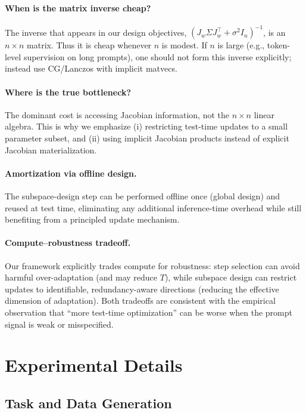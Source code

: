 \documentclass{article}
\theoremstyle{plain}
\theoremstyle{definition}
\theoremstyle{remark}
\begin{document}
\paragraph{When is the matrix inverse cheap?}
The inverse that appears in our design objectives, $(J_w\Sigma J_w^\top+\sigma^2 I_n)^{-1}$, is an $n\times n$ matrix.
Thus it is cheap whenever $n$ is modest. If $n$ is large (e.g., token-level supervision on long prompts),
one should not form this inverse explicitly; instead use CG/Lanczos with implicit matvecs.

\paragraph{Where is the true bottleneck?}
The dominant cost is accessing Jacobian information, not the $n\times n$ linear algebra.
This is why we emphasize (i) restricting test-time updates to a small parameter subset, and
(ii) using implicit Jacobian products instead of explicit Jacobian materialization.

\paragraph{Amortization via offline design.}
The subspace-design step can be performed offline once (global design) and reused at test time, eliminating
any additional inference-time overhead while still benefiting from a principled update mechanism.

\paragraph{Compute--robustness tradeoff.}
Our framework explicitly trades compute for robustness:
step selection can avoid harmful over-adaptation (and may reduce $T$), while subspace design can restrict updates
to identifiable, redundancy-aware directions (reducing the effective dimension of adaptation).
Both tradeoffs are consistent with the empirical observation that ``more test-time optimization'' can be worse
when the prompt signal is weak or misspecified.


\section{Experimental Details}\label{app:experiments}

\subsection{Task and Data Generation}
\end{document}
